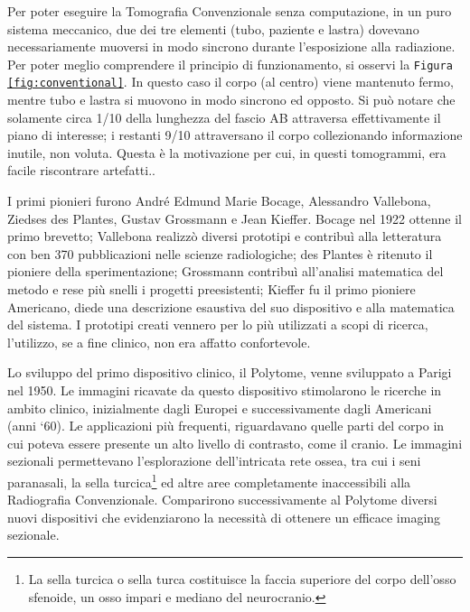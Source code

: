 \documentclass[a4paper,12pt, doubleside]{report}
\begin{document}
                    Per poter eseguire la Tomografia Convenzionale senza computazione, in un puro sistema meccanico, due dei tre elementi (tubo, paziente e lastra) dovevano necessariamente muoversi in modo sincrono durante l’esposizione alla radiazione. Per poter meglio comprendere il principio di funzionamento, si osservi la \texttt{Figura \ref{fig:conventional}}. In questo caso il corpo (al centro) viene mantenuto fermo, mentre tubo e lastra si muovono in modo sincrono ed opposto. Si può notare che solamente circa 1/10 della lunghezza del fascio AB attraversa effettivamente il piano di interesse; i restanti 9/10 attraversano il corpo collezionando informazione inutile, non voluta. Questa è la motivazione per cui, in questi tomogrammi, era facile riscontrare artefatti.\cite{hounsfield-nobel-lecture}.
                
                \bigskip
                \par
                    I primi pionieri furono André Edmund Marie Bocage, Alessandro Vallebona, Ziedses des Plantes, Gustav Grossmann e Jean Kieffer. Bocage nel 1922 ottenne il primo brevetto; Vallebona realizzò diversi prototipi e contribuì alla letteratura con ben 370 pubblicazioni nelle scienze radiologiche\cite{vallebona-ricordo}; des Plantes è ritenuto il pioniere della sperimentazione; Grossmann contribuì all’analisi matematica del metodo e rese più snelli i progetti preesistenti; Kieffer fu il primo pioniere Americano, diede una descrizione esaustiva del suo dispositivo e alla matematica del sistema. I prototipi creati vennero per lo più utilizzati a scopi di ricerca, l'utilizzo, se a fine clinico, non era affatto confortevole.
                
                \bigskip
                \par
                    Lo sviluppo del primo dispositivo clinico, il Polytome, venne sviluppato a Parigi nel 1950. Le immagini ricavate da questo dispositivo stimolarono le ricerche in ambito clinico, inizialmente dagli Europei e successivamente dagli Americani (anni ‘60).
                    Le applicazioni più frequenti, riguardavano quelle parti del corpo in cui poteva essere presente un alto livello di contrasto, come il cranio. Le immagini sezionali permettevano l’esplorazione dell’intricata rete ossea, tra cui i seni paranasali, la sella turcica\footnote{La sella turcica o sella turca costituisce la faccia superiore del corpo dell'osso sfenoide, un osso impari e mediano del neurocranio.} ed altre aree completamente inaccessibili alla Radiografia Convenzionale. Comparirono successivamente al Polytome diversi nuovi dispositivi che evidenziarono la necessità di ottenere un efficace imaging sezionale.
                
\end{document}
